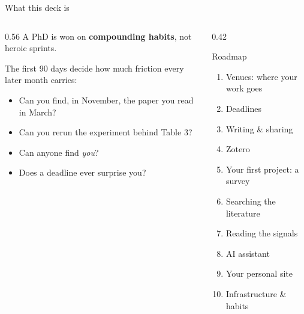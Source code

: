 \documentclass[aspectratio=169,11pt]{beamer}
\newcommand{\key}[1]{\textbf{\color{brand}#1}}
\begin{document}
\begin{frame}{What this deck is}
\begin{columns}[T]
\begin{column}{0.56\textwidth}
A PhD is won on \key{compounding habits}, not heroic sprints.


\medskip
The first 90 days decide how much friction every later month carries:
\begin{itemize}
  \item Can you find, in November, the paper you read in March?
  \item Can you rerun the experiment behind Table 3?
  \item Can anyone find \emph{you}?
  \item Does a deadline ever surprise you?
\end{itemize}
\end{column}
\begin{column}{0.42\textwidth}
\begin{block}{Roadmap}
\footnotesize
\begin{enumerate}
  \item Venues: where your work goes
  \item Deadlines
  \item Writing \& sharing
  \item Zotero
  \item Your first project: a survey
  \item Searching the literature
  \item Reading the signals
  \item AI assistant
  \item Your personal site
  \item Infrastructure \& habits
\end{enumerate}
\end{block}
\end{column}
\end{columns}
\end{frame}
\end{document}
